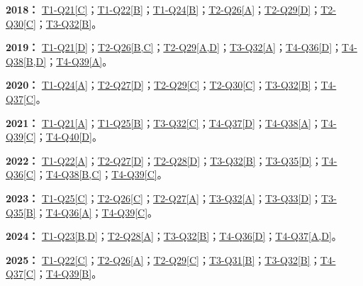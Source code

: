 \documentclass[11pt,a4paper]{article}
\begin{document}
\noindent\textbf{2018：} \hyperref[idx-2018-T1-Q21]{T1-Q21[C]}；\hyperref[idx-2018-T1-Q22]{T1-Q22[B]}；\hyperref[idx-2018-T1-Q24]{T1-Q24[B]}；\hyperref[idx-2018-T2-Q26]{T2-Q26[A]}；\hyperref[idx-2018-T2-Q29]{T2-Q29[D]}；\hyperref[idx-2018-T2-Q30]{T2-Q30[C]}；\hyperref[idx-2018-T3-Q32]{T3-Q32[B]}。\par\smallskip
\noindent\textbf{2019：} \hyperref[idx-2019-T1-Q21]{T1-Q21[D]}；\hyperref[idx-2019-T2-Q26]{T2-Q26[B,C]}；\hyperref[idx-2019-T2-Q29]{T2-Q29[A,D]}；\hyperref[idx-2019-T3-Q32]{T3-Q32[A]}；\hyperref[idx-2019-T4-Q36]{T4-Q36[D]}；\hyperref[idx-2019-T4-Q38]{T4-Q38[B,D]}；\hyperref[idx-2019-T4-Q39]{T4-Q39[A]}。\par\smallskip
\noindent\textbf{2020：} \hyperref[idx-2020-T1-Q24]{T1-Q24[A]}；\hyperref[idx-2020-T2-Q27]{T2-Q27[D]}；\hyperref[idx-2020-T2-Q29]{T2-Q29[C]}；\hyperref[idx-2020-T2-Q30]{T2-Q30[C]}；\hyperref[idx-2020-T3-Q32]{T3-Q32[B]}；\hyperref[idx-2020-T4-Q37]{T4-Q37[C]}。\par\smallskip
\noindent\textbf{2021：} \hyperref[idx-2021-T1-Q21]{T1-Q21[A]}；\hyperref[idx-2021-T1-Q25]{T1-Q25[B]}；\hyperref[idx-2021-T3-Q32]{T3-Q32[C]}；\hyperref[idx-2021-T4-Q37]{T4-Q37[D]}；\hyperref[idx-2021-T4-Q38]{T4-Q38[A]}；\hyperref[idx-2021-T4-Q39]{T4-Q39[C]}；\hyperref[idx-2021-T4-Q40]{T4-Q40[D]}。\par\smallskip
\noindent\textbf{2022：} \hyperref[idx-2022-T1-Q22]{T1-Q22[A]}；\hyperref[idx-2022-T2-Q27]{T2-Q27[D]}；\hyperref[idx-2022-T2-Q28]{T2-Q28[D]}；\hyperref[idx-2022-T3-Q32]{T3-Q32[B]}；\hyperref[idx-2022-T3-Q35]{T3-Q35[D]}；\hyperref[idx-2022-T4-Q36]{T4-Q36[C]}；\hyperref[idx-2022-T4-Q38]{T4-Q38[B,C]}；\hyperref[idx-2022-T4-Q39]{T4-Q39[C]}。\par\smallskip
\noindent\textbf{2023：} \hyperref[idx-2023-T1-Q25]{T1-Q25[C]}；\hyperref[idx-2023-T2-Q26]{T2-Q26[C]}；\hyperref[idx-2023-T2-Q27]{T2-Q27[A]}；\hyperref[idx-2023-T3-Q32]{T3-Q32[A]}；\hyperref[idx-2023-T3-Q33]{T3-Q33[D]}；\hyperref[idx-2023-T3-Q35]{T3-Q35[B]}；\hyperref[idx-2023-T4-Q36]{T4-Q36[A]}；\hyperref[idx-2023-T4-Q39]{T4-Q39[C]}。\par\smallskip
\noindent\textbf{2024：} \hyperref[idx-2024-T1-Q23]{T1-Q23[B,D]}；\hyperref[idx-2024-T2-Q28]{T2-Q28[A]}；\hyperref[idx-2024-T3-Q32]{T3-Q32[B]}；\hyperref[idx-2024-T4-Q36]{T4-Q36[D]}；\hyperref[idx-2024-T4-Q37]{T4-Q37[A,D]}。\par\smallskip
\noindent\textbf{2025：} \hyperref[idx-2025-T1-Q22]{T1-Q22[C]}；\hyperref[idx-2025-T2-Q26]{T2-Q26[A]}；\hyperref[idx-2025-T2-Q29]{T2-Q29[C]}；\hyperref[idx-2025-T3-Q31]{T3-Q31[B]}；\hyperref[idx-2025-T3-Q32]{T3-Q32[B]}；\hyperref[idx-2025-T4-Q37]{T4-Q37[C]}；\hyperref[idx-2025-T4-Q39]{T4-Q39[B]}。\par\smallskip
{}
\end{document}
